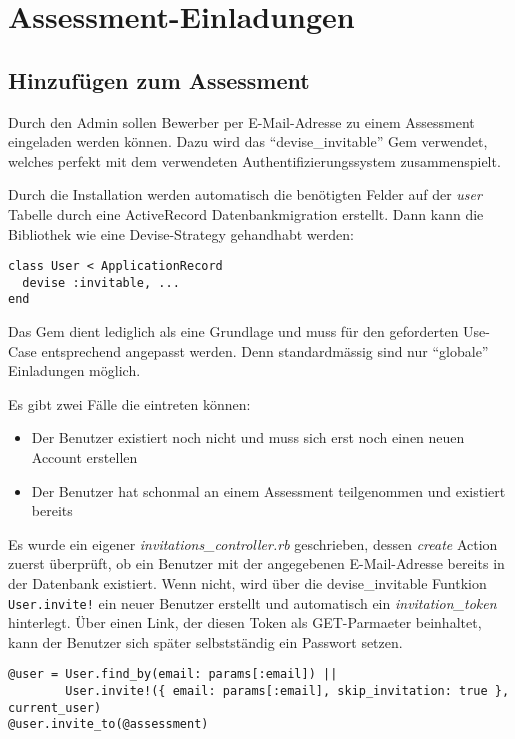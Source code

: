 \section{Assessment-Einladungen}

\subsection{Hinzufügen zum Assessment}

Durch den Admin sollen Bewerber per E-Mail-Adresse zu einem Assessment eingeladen werden können. Dazu wird
das \enquote{devise\_invitable} Gem verwendet, welches perfekt mit dem verwendeten Authentifizierungssystem zusammenspielt.

Durch die Installation werden automatisch die benötigten Felder auf der \emph{user} Tabelle durch eine ActiveRecord Datenbankmigration 
erstellt. Dann kann die Bibliothek wie eine Devise-Strategy gehandhabt werden:

\begin{codebox}
\begin{verbatim}
class User < ApplicationRecord
  devise :invitable, ...
end
\end{verbatim}
\end{codebox}

Das Gem dient lediglich als eine Grundlage und muss für den geforderten Use-Case entsprechend angepasst werden.
Denn standardmässig sind nur \enquote{globale} Einladungen möglich.

Es gibt zwei Fälle die eintreten können:
\begin{itemize}
  \item Der Benutzer existiert noch nicht und muss sich erst noch einen neuen Account erstellen
  \item Der Benutzer hat schonmal an einem Assessment teilgenommen und existiert bereits
\end{itemize}

Es wurde ein eigener \emph{invitations\_controller.rb} geschrieben, dessen \emph{create} Action zuerst überprüft, ob ein Benutzer
mit der angegebenen E-Mail-Adresse bereits in der Datenbank existiert. Wenn nicht, wird über die devise\_invitable Funtkion \texttt{User.invite!} 
ein neuer Benutzer erstellt und automatisch ein \emph{invitation\_token} hinterlegt. Über einen Link, der diesen Token als GET-Parmaeter beinhaltet,
kann der Benutzer sich später selbstständig ein Passwort setzen.

\begin{codebox}
\begin{verbatim}
@user = User.find_by(email: params[:email]) ||
        User.invite!({ email: params[:email], skip_invitation: true }, current_user)
@user.invite_to(@assessment)
\end{verbatim}
\end{codebox}

